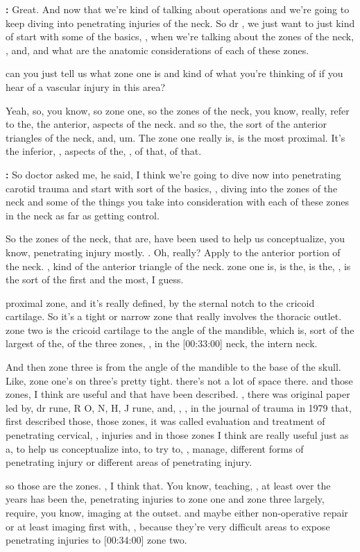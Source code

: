 \documentclass[
]{book}
\begin{document}
\textbf{:} Great. And now
that we're kind of talking about operations and we're going to keep
diving into penetrating injuries of the neck. So dr , we just want to
just kind of start with some of the basics, , when we're talking about
the zones of the neck, , and, and what are the anatomic considerations
of each of these zones.

can you just tell us what zone one is and kind of what you're
thinking of if you hear of a vascular injury in this area?

Yeah, so, you
know, so zone one, so the zones of the neck, you know, really, refer
to the, the anterior, aspects of the neck. and so the, the
sort of the anterior triangles of the neck, and, um. The zone one really
is, is the most proximal. It's the inferior, , aspects of the, , of
that, of that.

\textbf{:} So doctor asked
me, he said, I think we're going to dive now into penetrating carotid
trauma and start with sort of the basics, , diving into the zones of the
neck and some of the things you take into consideration with each of
these zones in the neck as far as getting control.

So the
zones of the neck, that are, have been used to help us
conceptualize, you know, penetrating injury mostly. . Oh, really?
Apply to the anterior portion of the neck. , kind of the anterior
triangle of the neck. zone one is, is the, is the, , is the sort of
the first and the most, I guess.

proximal zone, and it's really defined, by the sternal notch to
the cricoid cartilage. So it's a tight or narrow zone that really
involves the thoracic outlet. zone two is the cricoid cartilage to
the angle of the mandible, which is, sort of the largest of the, of
the three zones, , in the {[}00:33:00{]} neck, the intern neck.

And then zone three is from the angle of the mandible to the base of the
skull. Like, zone one's on three's pretty tight. there's not a lot
of space there. and those zones, I think are useful and that
have been described. , there was original paper led by, dr rune, R
O, N, H, J rune, and, , , in the journal of trauma in 1979 that, first
described those, those zones, it was called evaluation and treatment
of penetrating cervical, , injuries and in those zones I think are
really useful just as a, to help us conceptualize into, to try to, ,
manage, different forms of penetrating injury or different areas of
penetrating injury.

so those are the zones. , I think that. You know, teaching, , at
least over the years has been the, penetrating injuries to zone one and
zone three largely, require, you know, imaging at the outset.
and maybe either non-operative repair or at least imaging first with, ,
because they're very difficult areas to expose penetrating injuries to
{[}00:34:00{]} zone two.
\end{document}
